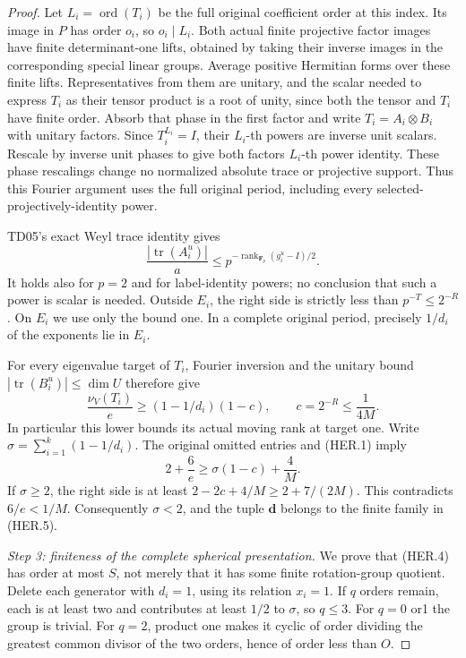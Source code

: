 \begin{proof}
Let \(L_i=\operatorname{ord}(T_i)\) be the full original coefficient
order at this index.  Its image in \(P\) has order \(o_i\), so
\(o_i\mid L_i\).  Both actual finite projective factor images have
finite determinant-one lifts, obtained by taking their inverse images
in the corresponding special linear groups.  Average positive
Hermitian forms over these finite lifts.  Representatives from them
are unitary, and the scalar needed to express \(T_i\) as their tensor
product is a root of unity, since both the tensor and \(T_i\) have
finite order.  Absorb that phase in the first factor and write
\(T_i=A_i\otimes B_i\) with unitary factors.  Since
\(T_i^{L_i}=I\), their \(L_i\)-th powers are inverse unit scalars.
Rescale by inverse unit phases to give both factors \(L_i\)-th power
identity.  These phase rescalings change no normalized absolute trace
or projective support.
Thus this Fourier argument uses the full original period, including
every selected-projectively-identity power.

TD05's exact Weyl trace identity gives
\[
 \frac{|\operatorname{tr}(A_i^u)|}{a}
 \le p^{-\operatorname{rank}_{\mathbf F_p}(g_i^u-I)/2}.
 \tag{HER.11}
\]
It holds also for \(p=2\) and for label-identity powers; no conclusion
that such a power is scalar is needed.  Outside \(E_i\), the right
side is strictly less than \(p^{-T}\le2^{-R}\).  On \(E_i\) we use only
the bound one.  In a complete original period, precisely \(1/d_i\)
of the exponents lie in \(E_i\).

For every eigenvalue target of \(T_i\), Fourier inversion and the
unitary bound \(|\operatorname{tr}(B_i^u)|\le\dim U\) therefore give
\[
 \frac{\nu_V(T_i)}e
 \ge (1-1/d_i)(1-c),\qquad c=2^{-R}\le\frac1{4M}.
 \tag{HER.12}
\]
In particular this lower bounds its actual moving rank at target one.
Write \(\sigma=\sum_{i=1}^k(1-1/d_i)\).  The original omitted entries
and (HER.1) imply
\[
  2+\frac6e\ge\sigma(1-c)+\frac4M.
 \tag{HER.13}
\]
If \(\sigma\ge2\), the right side is at least
\(2-2c+4/M\ge2+7/(2M)\).  This contradicts \(6/e<1/M\).
Consequently \(\sigma<2\), and the tuple \(\boldsymbol d\) belongs
to the finite family in (HER.5).

\emph{Step 3: finiteness of the complete spherical presentation.}
We prove that (HER.4) has order at most \(S\), not merely that it has
some finite rotation-group quotient.  Delete each generator with
\(d_i=1\), using its relation \(x_i=1\).  If \(q\) orders remain,
each is at least two and contributes at least \(1/2\) to \(\sigma\),
so \(q\le3\).
For \(q=0\) or1 the group is trivial.  For \(q=2\), product one makes
it cyclic of order dividing the greatest common divisor of the two
orders, hence of order less than \(O\).


\end{proof}
